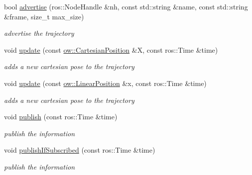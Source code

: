 \begin{DoxyCompactItemize}
\item 
bool \hyperlink{classow__pub_1_1TrajectoryPublisher_ab05d351bef06504b24198ace554d8e14}{advertise} (ros\+::\+Node\+Handle \&nh, const std\+::string \&name, const std\+::string \&frame, size\+\_\+t max\+\_\+size)
\begin{DoxyCompactList}\small\item\em advertise the trajectory \end{DoxyCompactList}\item 
void \hyperlink{classow__pub_1_1TrajectoryPublisher_a96091aca01ce94011a6bf1e2a870862f}{update} (const \hyperlink{classow__core_1_1CartesianPosition}{ow\+::\+Cartesian\+Position} \&X, const ros\+::\+Time \&time)
\begin{DoxyCompactList}\small\item\em adds a new cartesian pose to the trajectory \end{DoxyCompactList}\item 
void \hyperlink{classow__pub_1_1TrajectoryPublisher_ae972428a690694752dac75a3ed794f25}{update} (const \hyperlink{classow__core_1_1LinearPosition}{ow\+::\+Linear\+Position} \&x, const ros\+::\+Time \&time)
\begin{DoxyCompactList}\small\item\em adds a new cartesian pose to the trajectory \end{DoxyCompactList}\item 
void \hyperlink{classow__pub_1_1TrajectoryPublisher_ad641ed59759b939939e2f9a059ff896f}{publish} (const ros\+::\+Time \&time)
\begin{DoxyCompactList}\small\item\em publish the information \end{DoxyCompactList}\item 
void \hyperlink{classow__pub_1_1TrajectoryPublisher_a4b3010501946e9769ce5c205528371a4}{publish\+If\+Subscribed} (const ros\+::\+Time \&time)
\begin{DoxyCompactList}\small\item\em publish the information \end{DoxyCompactList}\end{DoxyCompactItemize}
